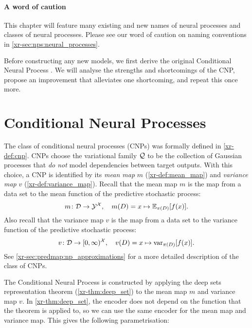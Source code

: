 \documentclass[12pt]{report}
\newcommand{\xrprefix}[1]{xr-#1}
\begin{document}
\paragraph{A word of caution}
This chapter will feature many existing and new names of neural processes and classes of neural processes.
Please see our word of caution on naming conventions in \cref{\xrprefix{sec:nps:neural_processes}}.

Before constructing any new models, we first derive the original Conditional Neural Process \parencite[CNP;][]{Garnelo:2018:Conditional_Neural_Processes}.
We will analyse the strengths and shortcomings of the CNP, propose an improvement that alleviates one shortcoming,
and repeat this once more.

\section{Conditional Neural Processes}
\label{sec:convcnps:cnps}

The class of conditional neural processes (CNPs) was formally defined in \cref{\xrprefix{def:cnp}}.
CNPs choose the variational family $\mathcal{Q}$ to be the collection of Gaussian processes that \emph{do not} model dependencies between target outputs.
With this choice, a CNP is identified by its \emph{mean map} $m$ (\cref{\xrprefix{def:mean_map}}) and \emph{variance map} $v$ (\cref{\xrprefix{def:variance_map}}).
Recall that the mean map $m$ is the map from a data set to the mean function of the predictive stochastic process:%
\begin{equation}
    m\colon \mathcal{D} \to \mathcal{Y}^{\mathcal{X}}, \quad
    m(D) = x \mapsto \mathbb{E}_{\pi(D)}[f(x)].
\end{equation}
Also recall that the variance map $v$ is the map from a data set to the variance function of the predictive stochastic process:
\begin{equation}
    v\colon \mathcal{D} \to [0, \infty)^{\mathcal{X}}, \quad
    v(D) = x \mapsto \operatorname{var}_{\pi(D)}[f(x)].
\end{equation}
See \cref{\xrprefix{sec:predmap:np_approximations}} for a more detailed description of the class of CNPs.

The Conditional Neural Process is constructed by applying the deep sets representation theorem (\cref{\xrprefix{thm:deep_set}}) to the mean map $m$ and variance map $v$.
In \cref{\xrprefix{thm:deep_set}}, the encoder does not depend on the function that the theorem is applied to, so we can use the same encoder for the mean map and variance map.
This gives the following parametrisation:
\end{document}
